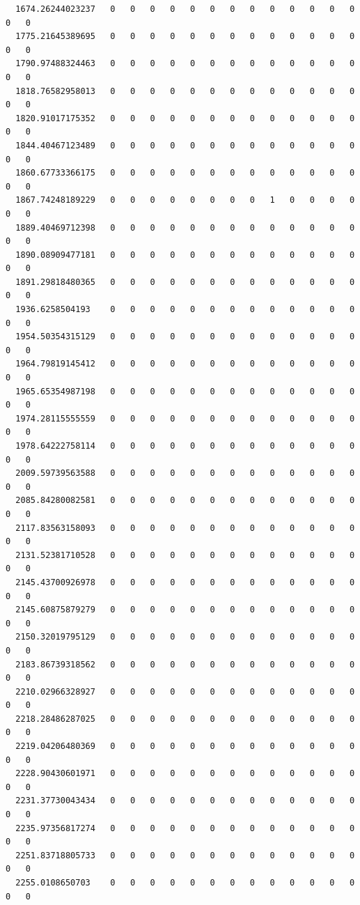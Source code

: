\documentclass[
  letterpaper,
  DIV=11,
  numbers=noendperiod]{scrartcl}
\begin{document}
\begin{verbatim}
  1674.26244023237   0   0   0   0   0   0   0   0   0   0   0   0   0   0   0
  1775.21645389695   0   0   0   0   0   0   0   0   0   0   0   0   0   0   0
  1790.97488324463   0   0   0   0   0   0   0   0   0   0   0   0   0   0   0
  1818.76582958013   0   0   0   0   0   0   0   0   0   0   0   0   0   0   0
  1820.91017175352   0   0   0   0   0   0   0   0   0   0   0   0   0   0   0
  1844.40467123489   0   0   0   0   0   0   0   0   0   0   0   0   0   0   0
  1860.67733366175   0   0   0   0   0   0   0   0   0   0   0   0   0   0   0
  1867.74248189229   0   0   0   0   0   0   0   0   1   0   0   0   0   0   0
  1889.40469712398   0   0   0   0   0   0   0   0   0   0   0   0   0   0   0
  1890.08909477181   0   0   0   0   0   0   0   0   0   0   0   0   0   0   0
  1891.29818480365   0   0   0   0   0   0   0   0   0   0   0   0   0   0   0
  1936.6258504193    0   0   0   0   0   0   0   0   0   0   0   0   0   0   0
  1954.50354315129   0   0   0   0   0   0   0   0   0   0   0   0   0   0   0
  1964.79819145412   0   0   0   0   0   0   0   0   0   0   0   0   0   0   0
  1965.65354987198   0   0   0   0   0   0   0   0   0   0   0   0   0   0   0
  1974.28115555559   0   0   0   0   0   0   0   0   0   0   0   0   0   0   0
  1978.64222758114   0   0   0   0   0   0   0   0   0   0   0   0   0   0   0
  2009.59739563588   0   0   0   0   0   0   0   0   0   0   0   0   0   0   0
  2085.84280082581   0   0   0   0   0   0   0   0   0   0   0   0   0   0   0
  2117.83563158093   0   0   0   0   0   0   0   0   0   0   0   0   0   0   0
  2131.52381710528   0   0   0   0   0   0   0   0   0   0   0   0   0   0   0
  2145.43700926978   0   0   0   0   0   0   0   0   0   0   0   0   0   0   0
  2145.60875879279   0   0   0   0   0   0   0   0   0   0   0   0   0   0   0
  2150.32019795129   0   0   0   0   0   0   0   0   0   0   0   0   0   0   0
  2183.86739318562   0   0   0   0   0   0   0   0   0   0   0   0   0   0   0
  2210.02966328927   0   0   0   0   0   0   0   0   0   0   0   0   0   0   0
  2218.28486287025   0   0   0   0   0   0   0   0   0   0   0   0   0   0   0
  2219.04206480369   0   0   0   0   0   0   0   0   0   0   0   0   0   0   0
  2228.90430601971   0   0   0   0   0   0   0   0   0   0   0   0   0   0   0
  2231.37730043434   0   0   0   0   0   0   0   0   0   0   0   0   0   0   0
  2235.97356817274   0   0   0   0   0   0   0   0   0   0   0   0   0   0   0
  2251.83718805733   0   0   0   0   0   0   0   0   0   0   0   0   0   0   0
  2255.0108650703    0   0   0   0   0   0   0   0   0   0   0   0   0   0   0

\end{verbatim}
\end{document}
